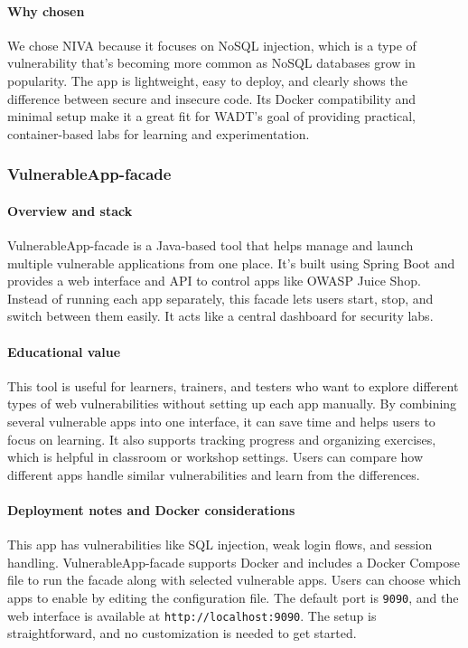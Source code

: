 \documentclass[12pt]{article}
\begin{document}
\paragraph{Why chosen}
We chose NIVA because it focuses on NoSQL injection, which is a type of vulnerability that’s becoming more common as NoSQL databases grow in popularity. The app is lightweight, easy to deploy, and clearly shows the difference between secure and insecure code. Its Docker compatibility and minimal setup make it a great fit for WADT’s goal of providing practical, container-based labs for learning and experimentation.

\subsubsection{VulnerableApp-facade}

\paragraph{Overview and stack}
VulnerableApp-facade is a Java-based tool that helps manage and launch multiple vulnerable applications from one place. It’s built using Spring Boot and provides a web interface and API to control apps like OWASP Juice Shop. Instead of running each app separately, this facade lets users start, stop, and switch between them easily. It acts like a central dashboard for security labs.

\paragraph{Educational value}
This tool is useful for learners, trainers, and testers who want to explore different types of web vulnerabilities without setting up each app manually. By combining several vulnerable apps into one interface, it can save time and helps users to focus on learning. It also supports tracking progress and organizing exercises, which is helpful in classroom or workshop settings. Users can compare how different apps handle similar vulnerabilities and learn from the differences.

\paragraph{Deployment notes and Docker considerations}
This app has vulnerabilities like SQL injection, weak login flows, and session handling. VulnerableApp-facade supports Docker and includes a Docker Compose file to run the facade along with selected vulnerable apps. Users can choose which apps to enable by editing the configuration file. The default port is \texttt{9090}, and the web interface is available at \texttt{http://localhost:9090}. The setup is straightforward, and no customization is needed to get started. 
\end{document}
